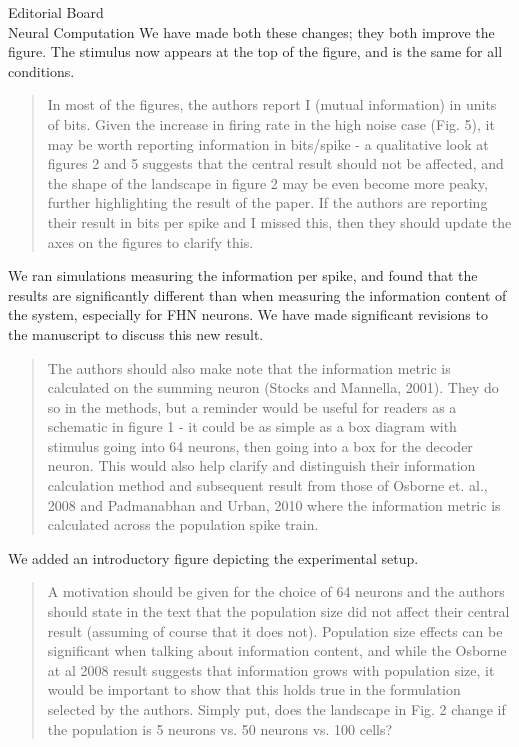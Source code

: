 \documentclass[]{letter}
\begin{document}
\begin{letter}{Editorial Board\\Neural Computation}
We have made both these changes; they both improve the figure. The stimulus now appears at the top of the figure, and is the same for all conditions.

\begin{quotation}
In most of the figures, the authors report I (mutual information) in units of bits.   Given the increase in firing rate in the high noise case (Fig. 5), it may be worth reporting information in bits/spike - a qualitative look at figures 2 and 5 suggests that the central result should not be affected, and the shape of the landscape in figure 2 may be even become more peaky, further highlighting the result of the paper.  If the authors are reporting their result in bits per spike and I missed this, then they should update the axes on the figures to clarify this.
\end{quotation}

We ran simulations measuring the information per spike, and found that the results are significantly different than when measuring the information content of the system, especially for FHN neurons. We have made significant revisions to the manuscript to discuss this new result.

\begin{quotation}
The authors should also make note that the information metric is calculated on the summing neuron (Stocks and Mannella, 2001).  They do so in the methods, but a reminder would be useful for readers as a schematic in figure 1 - it could be as simple as a box diagram with stimulus going into 64 neurons, then going into a box for the decoder neuron.  This would also help clarify and distinguish their information calculation method and subsequent result from those of Osborne et. al., 2008 and Padmanabhan and Urban, 2010 where the information metric is calculated across the population spike train.
\end{quotation}

We added an introductory figure depicting the experimental setup.

\begin{quotation}
A motivation should be given for the choice of 64 neurons and the authors should state in the text that the population size did not affect their central result (assuming of course that it does not).  Population size effects can be significant when talking about information content, and while the Osborne at al 2008 result suggests that information grows with population size, it would be important to show that this holds true in the formulation selected by the authors.  Simply put, does the landscape in Fig. 2 change if the population is 5 neurons vs. 50 neurons vs. 100 cells?
\end{quotation}


\end{letter}
\end{document}
